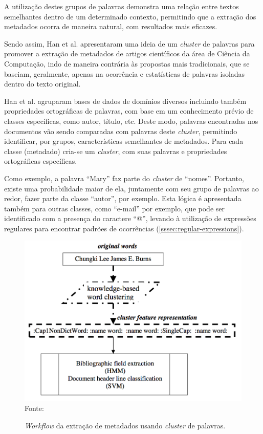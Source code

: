 A utilização destes grupos de palavras demonstra uma relação entre textos semelhantes dentro de um determinado contexto, permitindo que a extração dos metadados ocorra de maneira natural, com resultados mais eficazes.

Sendo assim, Han et al. apresentaram uma ideia de um \textit{cluster} de palavras para promover a extração de metadados de artigos científicos da área de Ciência da Computação, indo de maneira contrária às propostas mais tradicionais, que se baseiam, geralmente, apenas na ocorrência e estatísticas de palavras isoladas dentro do texto original.

Han et al. agruparam bases de dados de domínios diversos incluindo também propriedades ortográficas de palavras, com base em um conhecimento prévio de classes específicas, como autor, título, etc. Deste modo, palavras encontradas nos documentos vão sendo comparadas com palavras deste \textit{cluster}, permitindo identificar, por grupos, características semelhantes de metadados. Para cada classe (metadado) cria-se um \textit{cluster}, com suas palavras e propriedades ortográficas específicas.

Como exemplo, a palavra ``Mary'' faz parte do \textit{cluster} de ``nomes''. Portanto, existe uma probabilidade maior de ela, juntamente com seu grupo de palavras ao redor, fazer parte da classe ``autor'', por exemplo. Esta lógica é apresentada também para outras classes, como ``e-mail'' por exemplo, que pode ser identificado com a presença do caractere ``@'', levando à utilização de expressões regulares para encontrar padrões de ocorrências (\autoref{sssec:regular-expressions}).

\begin{figure}
    \centering
    \caption{\emph{Workflow} da extração de metadados usando \textit{cluster} de palavras.}
    \label{fig:workflow-rule-based}
    \includegraphics[width=0.7\linewidth]{./assets/images/workflow-rule-based}
    \center\footnotesize{Fonte: \cite{Han-Giles-WC}}
\end{figure}

